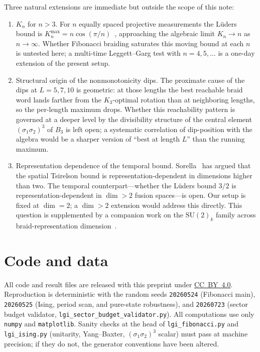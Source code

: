 \documentclass[aps,prx,reprint,amsmath,amssymb,floatfix,nofootinbib,superscriptaddress]{revtex4-2}
\begin{document}
Three natural extensions are immediate but outside the scope of this
note:
\begin{enumerate}
\item[\textbf{O1.}] $K_{n}$ for $n > 3$. For $n$ equally spaced
projective measurements the L\"uders bound is
$K_{n}^{\max} = n\cos(\pi/n)$~\cite{EmaryLambertNori2014}, approaching
the algebraic limit $K_{n} \to n$ as $n \to \infty$. Whether
Fibonacci braiding saturates this moving bound at each $n$ is
untested here; a multi-time Leggett--Garg test with $n=4,5,\ldots$ is
a one-day extension of the present setup.
\item[\textbf{O2.}] Structural origin of the nonmonotonicity dips.
The proximate cause of the dips at $L = 5, 7, 10$ is geometric: at
those lengths the best reachable braid word lands farther from the
$K_{3}$-optimal rotation than at neighboring lengths, so the
per-length maximum drops. Whether this reachability pattern is
governed at a deeper level by the divisibility structure of the
central element $(\sigma_{1}\sigma_{2})^{3}$ of $B_{3}$ is left open;
a systematic correlation of dip-position with the algebra would be a
sharper version of ``best at length $L$'' than the running maximum.
\item[\textbf{O3.}] Representation dependence of the temporal bound.
Sorella~\cite{Sorella2023} has argued that the spatial Tsirelson
bound is representation-dependent in dimensions higher than two. The
temporal counterpart---whether the L\"uders bound $3/2$ is
representation-dependent in $\dim > 2$ fusion spaces---is open. Our
setup is fixed at $\dim = 2$; a $\dim > 2$ extension would address
this directly. This question is supplemented by a companion work on
the $\mathrm{SU}(2)_k$ family across braid-representation
dimension~\cite{Sayim2026SU2k}.
\end{enumerate}

\section{Code and data}

All code and result files are released with this preprint under
\href{https://creativecommons.org/licenses/by/4.0/}{CC~BY~4.0}.
Reproduction is deterministic with the random seeds
\texttt{20260524} (Fibonacci main),
\texttt{20260525} (Ising, period scan, and pure-state robustness), and
\texttt{20260723} (sector budget validator,
\texttt{lgi\_sector\_budget\_validator.py}). All
computations use only \texttt{numpy} and \texttt{matplotlib}.
Sanity checks at the head of \texttt{lgi\_fibonacci.py} and
\texttt{lgi\_ising.py} (unitarity, Yang--Baxter,
$(\sigma_1\sigma_2)^3$ scalar) must pass at machine precision; if they
do not, the generator conventions have been altered.
\end{document}
